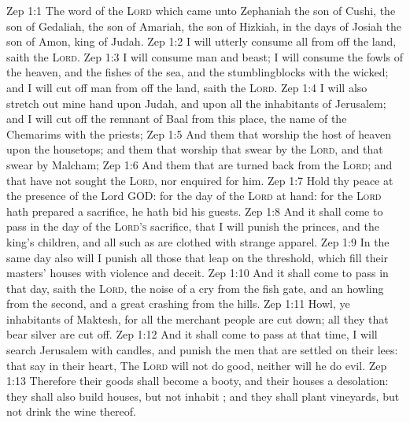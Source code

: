 \vs Zep 1:1 The word of the \textsc{Lord} which came unto Zephaniah the son of Cushi, the son of Gedaliah, the son of Amariah, the son of Hizkiah, in the days of Josiah the son of Amon, king of Judah.
\vs Zep 1:2 I will utterly consume all  from off the land, saith the \textsc{Lord}.
\vs Zep 1:3 I will consume man and beast; I will consume the fowls of the heaven, and the fishes of the sea, and the stumblingblocks with the wicked; and I will cut off man from off the land, saith the \textsc{Lord}.
\vs Zep 1:4 I will also stretch out mine hand upon Judah, and upon all the inhabitants of Jerusalem; and I will cut off the remnant of Baal from this place,  the name of the Chemarims with the priests;
\vs Zep 1:5 And them that worship the host of heaven upon the housetops; and them that worship  that swear by the \textsc{Lord}, and that swear by Malcham;
\vs Zep 1:6 And them that are turned back from the \textsc{Lord}; and  that have not sought the \textsc{Lord}, nor enquired for him.
\vs Zep 1:7 Hold thy peace at the presence of the Lord GOD: for the day of the \textsc{Lord}  at hand: for the \textsc{Lord} hath prepared a sacrifice, he hath bid his guests.
\vs Zep 1:8 And it shall come to pass in the day of the \textsc{Lord's} sacrifice, that I will punish the princes, and the king's children, and all such as are clothed with strange apparel.
\vs Zep 1:9 In the same day also will I punish all those that leap on the threshold, which fill their masters' houses with violence and deceit.
\vs Zep 1:10 And it shall come to pass in that day, saith the \textsc{Lord},  the noise of a cry from the fish gate, and an howling from the second, and a great crashing from the hills.
\vs Zep 1:11 Howl, ye inhabitants of Maktesh, for all the merchant people are cut down; all they that bear silver are cut off.
\vs Zep 1:12 And it shall come to pass at that time,  I will search Jerusalem with candles, and punish the men that are settled on their lees: that say in their heart, The \textsc{Lord} will not do good, neither will he do evil.
\vs Zep 1:13 Therefore their goods shall become a booty, and their houses a desolation: they shall also build houses, but not inhabit ; and they shall plant vineyards, but not drink the wine thereof.
